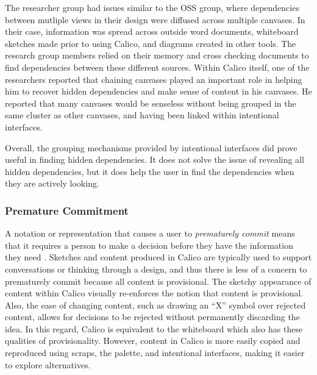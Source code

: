 The researcher group had issues similar to the OSS group, where dependencies between mutliple views in their design were diffused across multiple canvases. In their case, information was spread across outside word documents, whiteboard sketches made prior to using Calico, and diagrams created in other tools. The research group members relied on their memory and cross checking documents to find dependencies between these different sources. Within Calico itself, one of the researchers reported that chaining canvases played an important role in helping him to recover hidden dependencies and make sense of content in his canvases. He reported that many canvases would be senseless without being grouped in the same cluster as other canvases, and having been linked within intentional interfaces.

Overall, the grouping mechanisms provided by intentional interfaces did prove useful in finding hidden dependencies. It does not solve the issue of revealing all hidden dependencies, but it does help the user in find the dependencies when they are actively looking.

%


\subsubsection{Premature Commitment}
A notation or representation that causes a user to \textit{prematurely commit} means that it requires a person to make a decision before they have the information they need \cite{Petre2013BookChapter}. Sketches and content produced in Calico are typically used to support conversations or thinking through a design, and thus there is less of a concern to prematurely commit because all content is provisional. The sketchy appearance of content within Calico visually re-enforces the notion that content is provisional. Also, the ease of changing content, such as drawing an ``X'' symbol over rejected content, allows for decisions to be rejected without permanently discarding the idea. In this regard, Calico is equivalent to the whiteboard which also has these qualities of provisionality. However, content in Calico is more easily copied and reproduced using scraps, the palette, and intentional interfaces, making it easier to explore alternatives.

